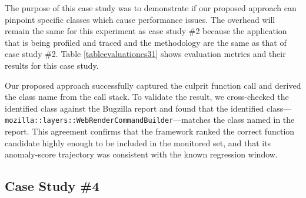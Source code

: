 \documentclass[pdflatex,sn-nature]{sn-jnl}%
\theoremstyle{thmstyleone}%
\theoremstyle{thmstyletwo}%
\theoremstyle{thmstylethree}%
\begin{document}
The purpose of this case study was to demonstrate if our proposed approach can pinpoint specific classes which cause performance issues. The overhead will remain the same for this experiment as case study \#2 because the application that is being profiled and traced and the methodology are the same as that of case study \#2. Table \ref{tableevaluationcs31} shows evaluation metrics and their results for this case study.

\begin{table}[tbp]

\centering
{}
\caption{Evaluation | Issue: Extremely Slow 3D Transformation Rendering With Firefox | Case Study: 3}
\label{tableevaluationcs31}
\end{table}

Our proposed approach successfully captured the culprit function call and derived the class name from the call stack. To validate the result, we cross-checked the identified class against the Bugzilla report and found that the identified class---\texttt{mozilla::layers::WebRenderCommandBuilder}---matches the class named in the report. This agreement confirms that the framework ranked the correct function candidate highly enough to be included in the monitored set, and that its anomaly-score trajectory was consistent with the known regression window.


\subsection{Case Study \#4}
\end{document}
